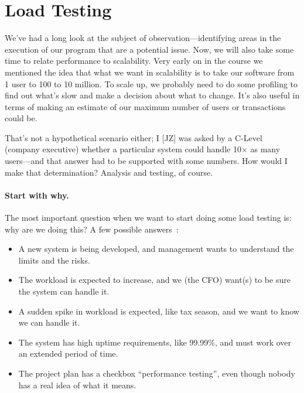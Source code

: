 




\section*{Load Testing}

We've had a long look at the subject of observation---identifying areas in the execution of our program that are a potential issue. Now, we will also take some time to relate performance to scalability. Very early on in the course we mentioned the idea that what we want in scalability is to take our software from 1 user to 100 to 10 million. To scale up, we probably need to do some profiling to find out what's slow and make a decision about what to change. It's also useful in terms of making an estimate of our maximum number of users or transactions could be. 

That's not a hypothetical scenario either; I [JZ] was asked by a C-Level (company executive) whether a particular system could handle 10$\times$ as many users---and that answer had to be supported with some numbers. How would I make that determination? Analysis and testing, of course.

\paragraph{Start with why.} The most important question when we want to start doing some load testing is: why are we doing this? A few possible answers~\cite{hitchhiking}:
\begin{itemize}[noitemsep]
	\item A new system is being developed, and management wants to understand the limits and the risks.
	\item The workload is expected to increase, and we (the CFO) want(s) to be sure the system can handle it.
	\item A sudden spike in workload is expected, like tax season, and we want to know we can handle it.
	\item The system has high uptime requirements, like 99.99\%, and must work over an extended period of time. 
	\item The project plan has a checkbox ``performance testing'', even though nobody has a real idea of what it means.
\end{itemize}


